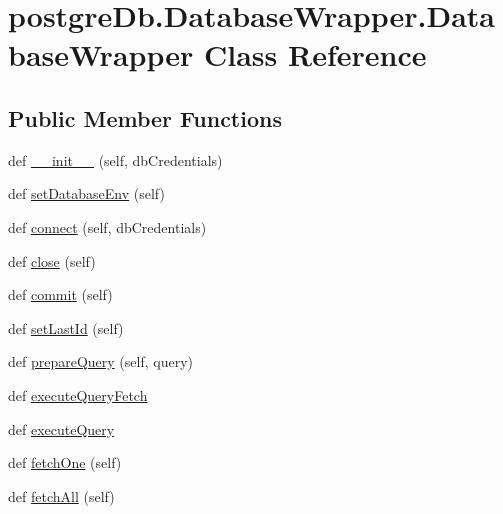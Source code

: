 \hypertarget{classpostgreDb_1_1DatabaseWrapper_1_1DatabaseWrapper}{}\section{postgre\+Db.\+Database\+Wrapper.\+Database\+Wrapper Class Reference}
\label{classpostgreDb_1_1DatabaseWrapper_1_1DatabaseWrapper}
\subsection*{Public Member Functions}
\begin{DoxyCompactItemize}
\item 
def \hyperlink{classpostgreDb_1_1DatabaseWrapper_1_1DatabaseWrapper_a7dc48302219ecef8b3676bea71458216}{\+\_\+\+\_\+init\+\_\+\+\_\+} (self, db\+Credentials)
\item 
def \hyperlink{classpostgreDb_1_1DatabaseWrapper_1_1DatabaseWrapper_a425194c5ae188ff38bea5ac3aa010aba}{set\+Database\+Env} (self)
\item 
def \hyperlink{classpostgreDb_1_1DatabaseWrapper_1_1DatabaseWrapper_a9403a1556bc565e6d463a94df2ddeb42}{connect} (self, db\+Credentials)
\item 
def \hyperlink{classpostgreDb_1_1DatabaseWrapper_1_1DatabaseWrapper_a220c9801486a986782d2bc85388c1155}{close} (self)
\item 
def \hyperlink{classpostgreDb_1_1DatabaseWrapper_1_1DatabaseWrapper_a1865425d520f671ca027d8efdc991531}{commit} (self)
\item 
def \hyperlink{classpostgreDb_1_1DatabaseWrapper_1_1DatabaseWrapper_ab7c38b341985028186600feed39f4bf7}{set\+Last\+Id} (self)
\item 
def \hyperlink{classpostgreDb_1_1DatabaseWrapper_1_1DatabaseWrapper_a3cd6c0df35212ec066ddf4b4cc157535}{prepare\+Query} (self, query)
\item 
def \hyperlink{classpostgreDb_1_1DatabaseWrapper_1_1DatabaseWrapper_a9848905411f8fc9a058d51b5be0b3bee}{execute\+Query\+Fetch}
\item 
def \hyperlink{classpostgreDb_1_1DatabaseWrapper_1_1DatabaseWrapper_af7b9034a434cd3c06dbf6324b9453a58}{execute\+Query}
\item 
def \hyperlink{classpostgreDb_1_1DatabaseWrapper_1_1DatabaseWrapper_a6f1b9d13a2bd1425ebfe8730369d23dd}{fetch\+One} (self)
\item 
def \hyperlink{classpostgreDb_1_1DatabaseWrapper_1_1DatabaseWrapper_a722dd5af60bd503b5a129701a775b8bc}{fetch\+All} (self)

\end{DoxyCompactItemize}
